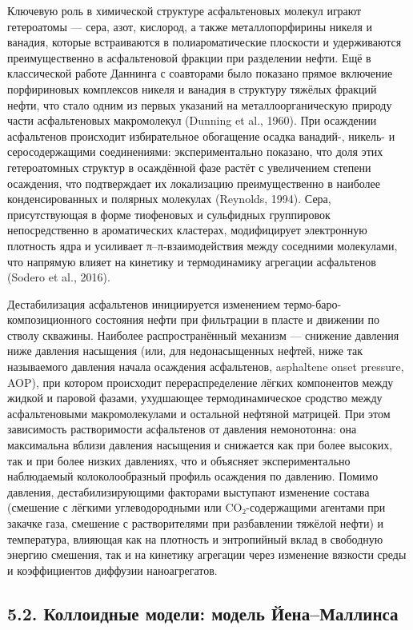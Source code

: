 \documentclass[11pt]{extarticle}
\begin{document}
Ключевую роль в химической структуре асфальтеновых молекул играют гетероатомы --- сера, азот, кислород, а также металлопорфирины никеля и ванадия, которые встраиваются в полиароматические плоскости и удерживаются преимущественно в асфальтеновой фракции при разделении нефти. Ещё в классической работе Даннинга с соавторами было показано прямое включение порфириновых комплексов никеля и ванадия в структуру тяжёлых фракций нефти, что стало одним из первых указаний на металлоорганическую природу части асфальтеновых макромолекул (Dunning et al., 1960). При осаждении асфальтенов происходит избирательное обогащение осадка ванадий-, никель- и серосодержащими соединениями: экспериментально показано, что доля этих гетероатомных структур в осаждённой фазе растёт с увеличением степени осаждения, что подтверждает их локализацию преимущественно в наиболее конденсированных и полярных молекулах (Reynolds, 1994). Сера, присутствующая в форме тиофеновых и сульфидных группировок непосредственно в ароматических кластерах, модифицирует электронную плотность ядра и усиливает π--π-взаимодействия между соседними молекулами, что напрямую влияет на кинетику и термодинамику агрегации асфальтенов (Sodero et al., 2016).

Дестабилизация асфальтенов инициируется изменением термо-баро-композиционного состояния нефти при фильтрации в пласте и движении по стволу скважины. Наиболее распространённый механизм --- снижение давления ниже давления насыщения (или, для недонасыщенных нефтей, ниже так называемого давления начала осаждения асфальтенов, asphaltene onset pressure, AOP), при котором происходит перераспределение лёгких компонентов между жидкой и паровой фазами, ухудшающее термодинамическое сродство между асфальтеновыми макромолекулами и остальной нефтяной матрицей. При этом зависимость растворимости асфальтенов от давления немонотонна: она максимальна вблизи давления насыщения и снижается как при более высоких, так и при более низких давлениях, что и объясняет экспериментально наблюдаемый колоколообразный профиль осаждения по давлению. Помимо давления, дестабилизирующими факторами выступают изменение состава (смешение с лёгкими углеводородными или CO₂-содержащими агентами при закачке газа, смешение с растворителями при разбавлении тяжёлой нефти) и температура, влияющая как на плотность и энтропийный вклад в свободную энергию смешения, так и на кинетику агрегации через изменение вязкости среды и коэффициентов диффузии наноагрегатов.

\subsection{5.2. Коллоидные модели: модель Йена--Маллинса}\label{ux43aux43eux43bux43bux43eux438ux434ux43dux44bux435-ux43cux43eux434ux435ux43bux438-ux43cux43eux434ux435ux43bux44c-ux439ux435ux43dux430ux43cux430ux43bux43bux438ux43dux441ux430}
\end{document}

